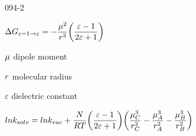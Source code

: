 \begin{mitframe}{094-2}
\begin{listone}
	\item $\iipf\gibbs_{\varepsilon=1\rightarrow\varepsilon}=-\dfrac{\chempot^2}{\pos^3}\bigg(\dfrac{\varepsilon-1}{2\varepsilon+1}\bigg)$
    	\begin{listtwo}
        	\item $\chempot$ dipole moment
            \item $\pos$ molecular radius
            \item $\varepsilon$ dielectric constant
        \end{listtwo}
	\item $ln\thermcond_{solv}=ln\thermcond_{vac}+\dfrac{\nummoles}{\gasconst\Temp}\bigg(\dfrac{\varepsilon-1}{2\varepsilon+1}\bigg)\bigg(\dfrac{\chempot^3_{\conc}}{\pos^2_{\conc}}-\dfrac{\chempot^3_{\helmholtz}}{\pos^2_{\helmholtz}}-\dfrac{\chempot^3_{\exergy}}{\pos^2_{\exergy}}\bigg)$
    
\end{listone}    
\end{mitframe}